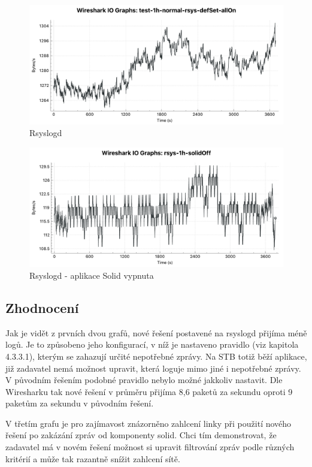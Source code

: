 \documentclass[thesis=B,czech]{FITthesis}[2012/06/26]
\begin{document}
\begin{figure}[H]
	\centering
	\includegraphics[scale=0.44]{images/test-1h-rsys-default}
	\caption[Rsyslogd]{Rsyslogd}
\end{figure}

\begin{figure}[H]
	\centering
	\includegraphics[scale=0.44]{images/test-1h-rsys-solidoff}
	\caption[Rsyslogd - aplikace Solid vypnuta]{Rsyslogd - aplikace Solid vypnuta}
\end{figure}

\subsection*{Zhodnocení}
Jak je vidět z prvních dvou grafů, nové řešení postavené na rsyslogd přijíma méně logů. Je to způsobeno jeho konfigurací, v níž je nastaveno pravidlo (viz kapitola 4.3.3.1), kterým se zahazují určité nepotřebné zprávy. Na STB totiž běží aplikace, již zadavatel nemá možnost upravit, která loguje mimo jiné i nepotřebné zprávy. V původním řešením podobné pravidlo nebylo možné jakkoliv nastavit.
Dle Wiresharku tak nové řešení v průměru přijíma 8,6 paketů za sekundu oproti 9 paketům za sekundu v původním řešení.

V třetím grafu je pro zajímavost znázorněno zahlcení linky při použití nového řešení po zakázání zpráv od komponenty solid.
Chci tím demonstrovat, že zadavatel má v novém řešení možnost si upravit filtrování zpráv podle různých kritérií a může tak razantně snížit zahlcení sítě.
\end{document}
